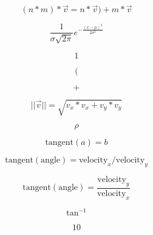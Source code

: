 \documentclass[12pt, a4paper]{article}
\begin{document}
\begin{equation}
\label{nmtimesv2}
(n * m) * \vec{v} = n * \vec{v}) + m * \vec{v}
\end{equation}

\begin{equation}
\label{normal}
\frac{1}{\sigma\sqrt{2\pi}}e^{-\frac{(x-\mu)^2}{2\sigma^2}}
\end{equation}

\begin{equation}
\label{one}
1
\end{equation}

\begin{equation}
\label{open}
(
\end{equation}

\begin{equation}
\label{plus}
+
\end{equation}

\begin{equation}
\label{pythagorean}
||\vec{v}||=\sqrt{v_x * v_x + v_y * v_y}
\end{equation}

\begin{equation}
\label{rho}
\rho
\end{equation}

\begin{equation}
\label{tangentab}
\textrm{tangent}(a) = b
\end{equation}

\begin{equation}
\label{tangentvelocity}
\textrm{tangent}(\textrm{angle}) = \textrm{velocity}_x/\textrm{velocity}_y
\end{equation}

\begin{equation}
\label{tangentvelocityfrac}
\textrm{tangent}(\textrm{angle}) = \frac{\textrm{velocity}_y}{\textrm{velocity}_x}
\end{equation}

\begin{equation}
\label{tani1}
\tan^{-1}
\end{equation}

\begin{equation}
\label{ten}
10
\end{equation}
\end{document}

